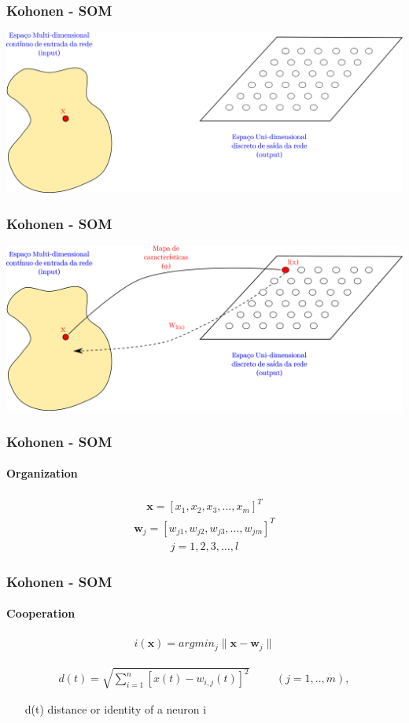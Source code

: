 \documentclass[aspectratio=10]{beamer} %
\begin{document}
\begin{frame}
 \frametitle{Kohonen - SOM}
 \includegraphics[scale=0.5]{Imagens/IntroKoho3.png} 
\end{frame}

\begin{frame}
 \frametitle{Kohonen - SOM}
 \includegraphics[scale=0.5]{Imagens/IntroKoho4.png} 
\end{frame}

\begin{frame}
	\frametitle{Kohonen - SOM}
	\framesubtitle{Organization}

	\begin{eqnarray}
	\textbf{x}=[x_{1}, x_{2}, x_{3}, ..., x_{m}]^{T} \nonumber
	\end{eqnarray}
	\pause
	\begin{eqnarray}
	\textbf{w}_{j}= [w_{j1}, w_{j2}, w_{j3}, ..., w_{jm}]^{T} \nonumber
	\end{eqnarray}
	\pause
	\begin{eqnarray}
	j=1,2,3,\hdots,l \nonumber
	\end{eqnarray}
\end{frame}

\begin{frame}
    \frametitle{Kohonen - SOM}
    \framesubtitle{Cooperation}
	\begin{eqnarray}
	i(\textbf{x})= argmin_{j}  \parallel \textbf{x} - \textbf{w}_{j} \parallel \nonumber
	\end{eqnarray}
	
	\begin{eqnarray}
	d(t)= \sqrt{\sum^{n}_{i=1}[x(t)-w_{i,j}(t)]^{2}} \hspace{1cm}  (j = {1,..,m}), \nonumber
	\label{eq1}
	\end{eqnarray}
	
	\begin{itemize}
		\centering
		\item[d(t)] distance or identity of a neuron i
	\end{itemize}

\end{frame}
\end{document}

